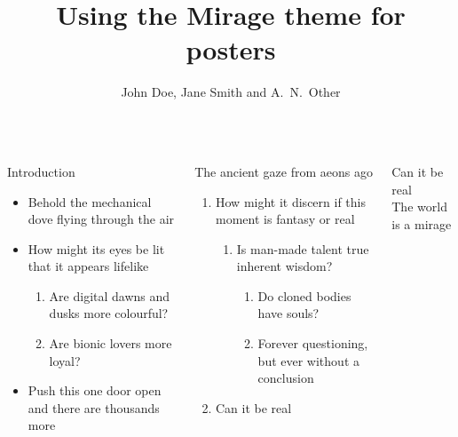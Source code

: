 \documentclass{beamer}
\title{Using the Mirage theme for posters}
\author{John Doe, Jane Smith and A.~N.~Other }
\begin{document}
\begin{frame}

\begin{columns}[T]
\begin{block}{Introduction}

\begin{itemize}
    \item Behold the mechanical dove \faDove{} flying through the air 
    \item How might its eyes be lit \faEye[regular] that it appears lifelike

\begin{enumerate}
    \item Are digital dawns and dusks \faCloudSun{} more colourful? \faCloudMoon
    \item Are bionic lovers \faGrinHearts{} more loyal? \faGrin*[regular]
\end{enumerate}

    \item Push this one door open \faDoorOpen{} and there are thousands more \faDoorClosed{\small\faDoorClosed}{\footnotesize\faDoorClosed}{\scriptsize\faDoorClosed}{\tiny\faDoorClosed}
\end{itemize}

\end{block}

\begin{block}{The ancient gaze from aeons ago}
    \begin{enumerate}
        \item How might it discern if this moment is fantasy or real
        \begin{enumerate}
	        \item Is man-made talent true inherent wisdom?
	        \begin{enumerate}
		        \item Do cloned bodies have souls?
		        \item Forever questioning, but ever without a conclusion
	        \end{enumerate}
        \end{enumerate}
        \item \alert{Can it be real}
    \end{enumerate}
\end{block}

\begin{pullquote}
    Can it be real\\
    The world is a mirage
\end{pullquote}


\end{columns}
\end{frame}
\end{document}
